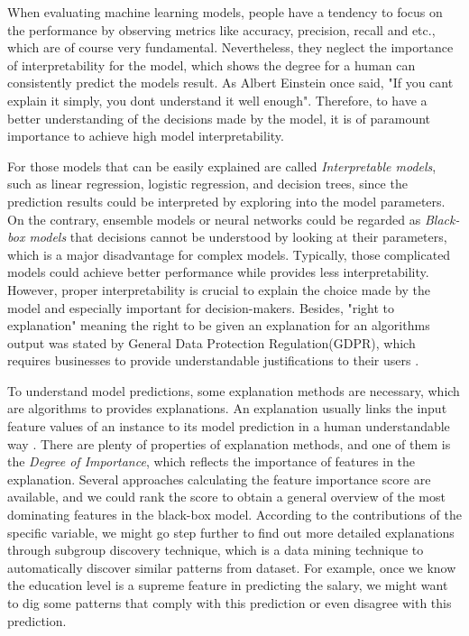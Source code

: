 \documentclass[runningheads]{llncs}
\begin{document}
	When evaluating machine learning models, people have a tendency to focus on the performance by observing metrics like accuracy, precision, recall and etc., which are of course very fundamental. Nevertheless, they neglect the importance of interpretability for the model, which shows the degree for a human can consistently predict the model\textquotesingle s result\cite{kim2016examples}. As Albert Einstein once said, "If you can\textquotesingle t explain it simply, you don\textquotesingle t understand it well enough". Therefore, to have a better understanding of the decisions made by the model, it is of paramount importance to achieve high model interpretability.
	
	For those models that can be easily explained are called \textit{Interpretable models}, such as linear regression, logistic regression, and decision trees, since the prediction results could be interpreted by exploring into the model parameters. On the contrary, ensemble models or neural networks could be regarded as \textit{Black-box models} that decisions cannot be understood by looking at their parameters, which is a major disadvantage for complex models. Typically, those complicated models could achieve better performance while provides less interpretability. However, proper interpretability is crucial to explain the choice made by the model and especially important for decision-makers. Besides, "right to explanation" meaning the right to be given an explanation for an algorithm\textquotesingle s output was stated by General Data Protection Regulation(GDPR), which requires businesses to provide understandable justifications to their users \cite{voigt2017eu}.
	
	To understand model predictions, some explanation methods are necessary, which are algorithms to provides explanations. An explanation usually links the input feature values of an instance to its model prediction in a human understandable way \cite{molnar2019}. There are plenty of properties of explanation methods, and one of them is the \textit{Degree of Importance}, which reflects the importance of features in the explanation\cite{robnik2018perturbation}. Several approaches calculating the feature importance score are available, and we could rank the score to obtain a general overview of the most dominating features in the black-box model. According to the contributions of the specific variable, we might go step further to find out more detailed explanations through subgroup discovery technique, which is a data mining technique to automatically discover similar patterns from dataset. For example, once we know the education level is a supreme feature in predicting the salary, we might want to dig some patterns that comply with this prediction or even disagree with this prediction.  
	
\end{document}

